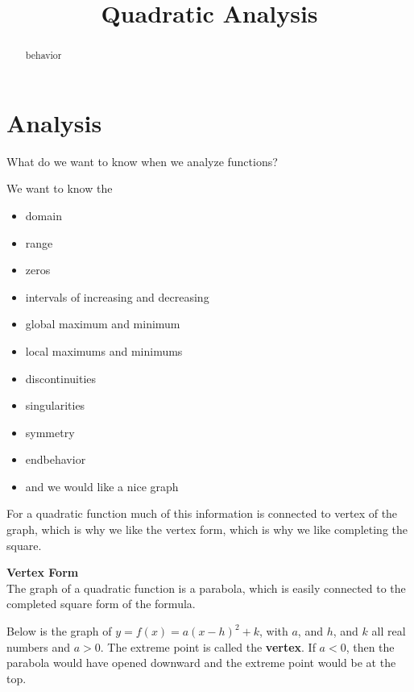 \documentclass{ximera}
\title{Quadratic Analysis}
\begin{document}
\begin{abstract}
behavior
\end{abstract}
\maketitle





\section{Analysis}

What do we want to know when we analyze functions?

We want to know the 


\begin{itemize}
\item domain
\item range
\item zeros
\item intervals of increasing and decreasing
\item global maximum and minimum
\item local maximums and minimums
\item discontinuities
\item singularities
\item symmetry
\item endbehavior \\
\item and we would like a nice graph
\end{itemize}


For a quadratic function much of this information is connected to vertex of the graph, which is why we like the vertex form, which is why we like completing the square.







\textbf{Vertex Form} \\

The graph of a quadratic function is a parabola, which is easily connected to the completed square form of the formula.

Below is the graph of $y = f(x) = a (x - h)^2 + k$, with $a$, and $h$, and $k$ all real numbers and $a > 0$. The extreme point is called the \textbf{vertex}. If $a<0$, then the parabola would have opened downward and the extreme point would be at the top.
\end{document}
